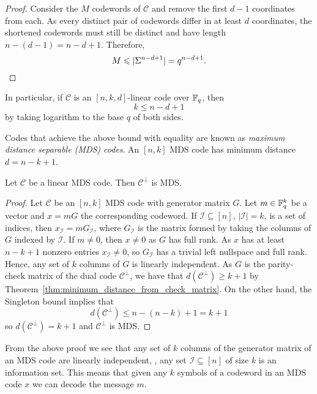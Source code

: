 \documentclass[../main.tex]{subfiles}
\begin{document}
\begin{proof}
Consider the $M$ codewords of $\mathcal{C}$ and remove the first $d - 1$ coordinates from each. As every distinct pair of codewords differ in at least $d$ coordinates, the shortened codewords must still be distinct and have length $n - (d - 1) = n - d + 1$. Therefore,
\begin{equation*}
    M \leq \lvert \Sigma^{n - d + 1} \rvert = q^{n - d + 1}. \qedhere
\end{equation*}
\end{proof}

In particular, if $\mathcal{C}$ is an $[n, k, d]$-linear code over $\F_q$, then
\begin{equation*}
    k \leq n - d + 1
\end{equation*}
by taking logarithm to the base $q$ of both sides.

Codes that achieve the above bound with equality are known as \emph{maximum distance separable (MDS) codes}. An $[n, k]$ MDS code has minimum distance $d = n - k + 1$.

\begin{theorem}\label{thm:dual_MDS}
Let $\mathcal{C}$ be a linear MDS code. Then $\mathcal{C}^\perp$ is MDS.
\end{theorem}

\begin{proof}
Let $\mathcal{C}$ be an $[n, k]$ MDS code with generator matrix $G$. Let $m \in \F_q^k$ be a vector and $x = mG$ the corresponding codeword. If $\mathcal{I} \subseteq [n]$, $\lvert \mathcal{I} \rvert = k$, is a set of indices, then $x_\mathcal{I} = mG_\mathcal{I}$, where $G_\mathcal{I}$ is the matrix formed by taking the columns of $G$ indexed by $\mathcal{I}$. If $m \neq 0$, then $x \neq 0$ as $G$ has full rank. As $x$ has at least $n - k + 1$ nonzero entries $x_\mathcal{I} \neq 0$, so $G_\mathcal{I}$ has a trivial left nullspace and full rank. Hence, any set of $k$ columns of $G$ is linearly independent. As $G$ is the parity-check matrix of the dual code $\mathcal{C}^\perp$, we have that $d(\mathcal{C}^\perp) \geq k + 1$ by Theorem~\ref{thm:minimum_distance_from_check_matrix}. On the other hand, the Singleton bound implies that
\begin{equation*}
    d(\mathcal{C}^\perp) \leq n - (n - k) + 1 = k + 1
\end{equation*}
so $d(\mathcal{C}^\perp) = k + 1$ and $\mathcal{C}^\perp$ is MDS.
\end{proof}

From the above proof we see that any set of $k$ columns of the generator matrix of an MDS code are linearly independent, \ie, any set $\mathcal{I} \subseteq [n]$ of size $k$ is an information set. This means that given any $k$ symbols of a codeword in an MDS code $x$ we can decode the message $m$.
\end{document}
